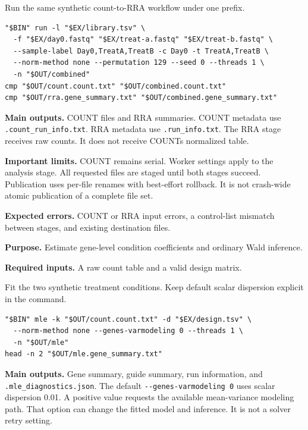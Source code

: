\documentclass[11pt,a4paper]{article}
\makeatletter
\renewcommand\section{\@startsection{section}{1}{\z@}{-3.2ex plus -1ex minus -.2ex}{1.2ex plus .2ex}{\normalfont\Large\bfseries\color{ManualBlue}}}
\makeatother
\begin{document}
Run the same synthetic count-to-RRA workflow under one prefix.

\begin{verbatim}
"$BIN" run -l "$EX/library.tsv" \
  -f "$EX/day0.fastq" "$EX/treat-a.fastq" "$EX/treat-b.fastq" \
  --sample-label Day0,TreatA,TreatB -c Day0 -t TreatA,TreatB \
  --norm-method none --permutation 129 --seed 0 --threads 1 \
  -n "$OUT/combined"
cmp "$OUT/count.count.txt" "$OUT/combined.count.txt"
cmp "$OUT/rra.gene_summary.txt" "$OUT/combined.gene_summary.txt"
\end{verbatim}

\textbf{Main outputs.} COUNT files and RRA summaries. COUNT metadata use \texttt{\small .\allowbreak{}count\_\allowbreak{}run\_\allowbreak{}info.\allowbreak{}txt}. RRA metadata use \texttt{\small .\allowbreak{}run\_\allowbreak{}info.\allowbreak{}txt}. The RRA stage receives raw counts. It does not receive COUNT\textquotesingle s normalized table.

\textbf{Important limits.} COUNT remains serial. Worker settings apply to the analysis stage. All requested files are staged until both stages succeed. Publication uses per-file renames with best-effort rollback. It is not crash-wide atomic publication of a complete file set.

\textbf{Expected errors.} COUNT or RRA input errors, a control-list mismatch between stages, and existing destination files.

\section{MLE}\label{mle}

\textbf{Purpose.} Estimate gene-level condition coefficients and ordinary Wald inference.

\textbf{Required inputs.} A raw count table and a valid design matrix.

Fit the two synthetic treatment conditions. Keep default scalar dispersion explicit in the command.

\begin{verbatim}
"$BIN" mle -k "$OUT/count.count.txt" -d "$EX/design.tsv" \
  --norm-method none --genes-varmodeling 0 --threads 1 \
  -n "$OUT/mle"
head -n 2 "$OUT/mle.gene_summary.txt"
\end{verbatim}

\textbf{Main outputs.} Gene summary, guide summary, run information, and \texttt{\small .\allowbreak{}mle\_\allowbreak{}diagnostics.\allowbreak{}json}. The default \texttt{\small -\allowbreak{}-\allowbreak{}genes-\allowbreak{}varmodeling 0} uses scalar dispersion 0.01. A positive value requests the available mean-variance modeling path. That option can change the fitted model and inference. It is not a solver retry setting.
\end{document}
